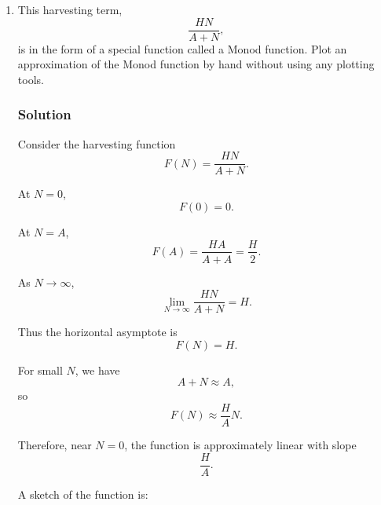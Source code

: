 \documentclass[12pt]{amsart}
\theoremstyle{conjecture}
\theoremstyle{definition}
\theoremstyle{question}
\theoremstyle{theorem}
\begin{document}
    \begin{enumerate}[label=(\alph*)]

        \item
        This harvesting term,
        \[
            \frac{HN}{A+N},
        \]
        is in the form of a special function called a Monod function. Plot an
        approximation of the Monod function by hand without using any plotting
        tools.

        \subsubsection*{Solution}

        Consider the harvesting function
        \[
            F(N)=\frac{HN}{A+N}.
        \]

        At \(N=0\),
        \[
            F(0)=0.
        \]

        At \(N=A\),
        \[
            F(A)
            =
            \frac{HA}{A+A}
            =
            \frac{H}{2}.
        \]

        As \(N\to\infty\),
        \[
            \lim_{N\to\infty}
            \frac{HN}{A+N}
            =
            H.
        \]

        Thus the horizontal asymptote is
        \[
            \boxed{F(N)=H}.
        \]

        For small \(N\), we have
        \[
            A+N\approx A,
        \]
        so
        \[
            F(N)
            \approx
            \frac{H}{A}N.
        \]

        Therefore, near \(N=0\), the function is approximately linear with
        slope
        \[
            \frac{H}{A}.
        \]

        A sketch of the function is:

        \begin{center}
\end{center}
\end{enumerate}
\end{document}
